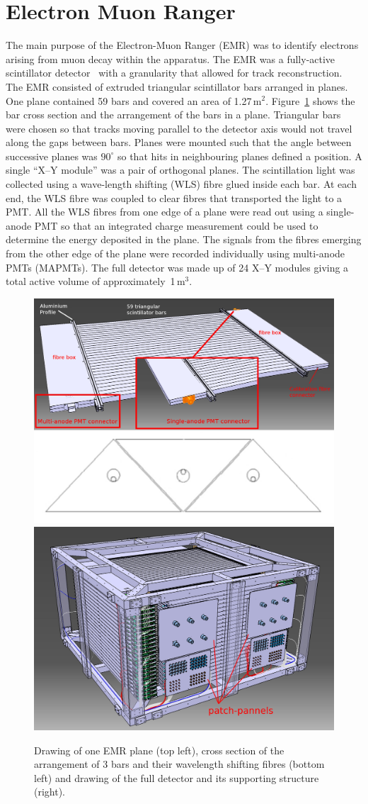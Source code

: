 \graphicspath{{05-EMR/Figures/}}

\section{Electron Muon Ranger}
\label{Sect:EMR}

The main purpose of the Electron-Muon Ranger (EMR) was to identify
electrons arising from muon decay within the apparatus.  
The EMR was a fully-active scintillator
detector~\cite{2016JInst..11T10007} with a granularity that allowed
for track reconstruction.
The EMR consisted of extruded triangular scintillator bars arranged in
planes.
One plane contained 59 bars and covered an area of 1.27\,m$^2$.
Figure~\ref{fig:EMR} shows the bar cross section and the arrangement of the
bars in a plane.
Triangular bars were chosen so that tracks moving parallel to the
detector axis would not travel along the gaps between bars. 
Planes were mounted such that the angle between successive planes was
$90^{\circ}$ so that hits in neighbouring planes defined a position.
A single ``X--Y module'' was a pair of orthogonal planes.
The scintillation light was collected using a wave-length shifting
(WLS) fibre glued inside each bar.
At each end, the WLS fibre was coupled to clear fibres that
transported the light to a PMT.
All the WLS fibres from one edge of a plane were read out using a
single-anode PMT so that an integrated charge measurement could be
used to determine the energy deposited in the plane.
The signals from the fibres emerging from the other edge of the plane
were recorded individually using multi-anode PMTs (MAPMTs). 
The full detector was made up of 24 X--Y modules giving a total active 
volume of approximately~1\,m$^3$.
\begin{figure}[htb!]
  \begin{center}
    \includegraphics[width=0.465\columnwidth]{EMR1.png}
    \hfill
    \includegraphics[width=0.515\columnwidth]{EMR2.jpg}
  \end{center}
  \caption{
    Drawing of one EMR plane (top left), cross section of the
    arrangement of 3 bars and their wavelength shifting fibres (bottom
    left) and drawing of the full detector and its supporting
    structure (right).
  }
  \label{fig:EMR}
\end{figure}

